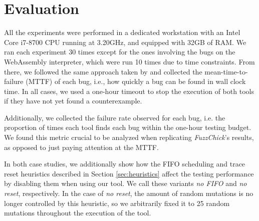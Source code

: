 \documentclass[sigconf, anonymous]{acmart}
\newcommand{\fuzzchick}{\textit{FuzzChick}\xspace}
\begin{document}


\section{Evaluation}
\label{sec:evaluation}

All the experiments were performed in a dedicated workstation with an Intel Core
i7-8700 CPU running at 3.20GHz, and equipped with 32GB of RAM.
%
We ran each experiment 30 times except for the ones involving the bugs on the
WebAssembly interpreter, which were run 10 times due to time constraints.
%
From there, we followed the same approach taken by
\citeauthor{lampropoulos2019coverage} and collected the mean-time-to-failure
(MTTF) of each bug, i.e., how quickly a bug can be found in wall clock time.
%
In all cases, we used a one-hour timeout to stop the execution of both tools if
they have not yet found a counterexample.

Additionally, we collected the failure rate observed for each bug, i.e. the
proportion of times each tool finds each bug within the one-hour testing budget.
%
We found this metric crucial to be analyzed when replicating \fuzzchick's
results, as opposed to just paying attention at the MTTF.

In both case studies, we additionally show how the FIFO scheduling and trace
reset heuristics described in Section \ref{sec:heuristics} affect the testing
performance by disabling them when using our tool.
%
We call these variants \textit{no FIFO} and \textit{no reset}, respectively.
%
In the case of \textit{no reset}, the amount of random mutations is no longer
controlled by this heuristic, so we arbitrarily fixed it to 25 random mutations
throughout the execution of the tool.
\end{document}

